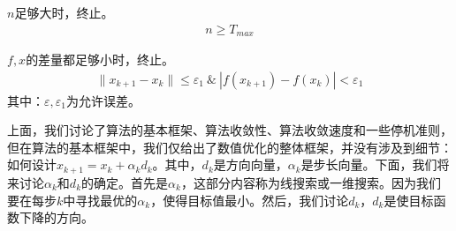     $n$足够大时，终止。
        \begin{align*}
        n \ge T_{max}
        \end{align*}
    \par
    $f,x$的差量都足够小时，终止。
        \begin{align*}
        \|x_{k+1}-x_{k}\| \le {\varepsilon}_1\ \& \ |f(x_{k+1})-f(x_{k})| < {\varepsilon}_1
        \end{align*}
    其中：$\varepsilon ,{\varepsilon}_1$为允许误差。
    \par
    上面，我们讨论了算法的基本框架、算法收敛性、算法收敛速度和一些停机准则，但在算法的基本框架中，我们仅给出了数值优化的整体框架，并没有涉及到细节：如何设计$x_{k+1}=x_k+{{\alpha}_k}{d_k}$。其中，$d_k$是方向向量，${\alpha}_k$是步长向量。下面，我们将来讨论${\alpha}_k$和$d_k$的确定。首先是${\alpha}_k$，这部分内容称为线搜索或一维搜索。因为我们要在每步$k$中寻找最优的${\alpha}_k$，使得目标值最小。然后，我们讨论$d_k$，$d_k$是使目标函数下降的方向。
